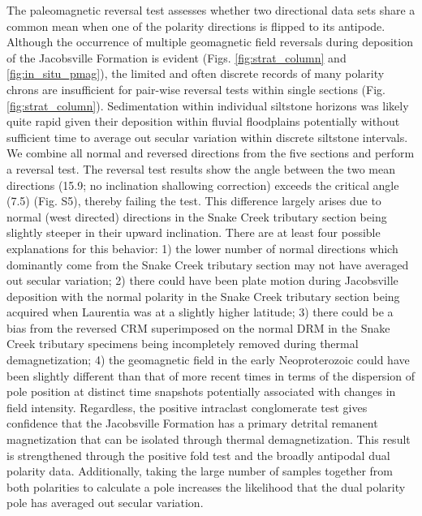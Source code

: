 \documentclass[draft]{agujournal2019}
\begin{document}
The paleomagnetic reversal test assesses whether two directional data sets share a common mean when one of the polarity directions is flipped to its antipode. Although the occurrence of multiple geomagnetic field reversals during deposition of the Jacobsville Formation is evident (Figs. \ref{fig:strat_column} and \ref{fig:in_situ_pmag}), the limited and often discrete records of many polarity chrons are insufficient for pair-wise reversal tests within single sections (Fig. \ref{fig:strat_column}). Sedimentation within individual siltstone horizons was likely quite rapid given their deposition within fluvial floodplains potentially without sufficient time to average out secular variation within discrete siltstone intervals. We combine all normal and reversed directions from the five sections and perform a reversal test. The  reversal test results show the angle between the two mean directions (15.9\textdegree; no inclination shallowing correction) exceeds the critical angle (7.5\textdegree) (Fig. S5), thereby failing the test. This difference largely arises due to normal (west directed) directions in the Snake Creek tributary section being slightly steeper in their upward inclination. There are at least four possible explanations for this behavior: 1) the lower number of normal directions which dominantly come from the Snake Creek tributary section may not have averaged out secular variation; 2) there could have been plate motion during Jacobsville deposition with the normal polarity in the Snake Creek tributary section being acquired when Laurentia was at a slightly higher latitude; 3) there could be a bias from the reversed CRM superimposed on the normal DRM in the Snake Creek tributary specimens being incompletely removed during thermal demagnetization; 4) the geomagnetic field in the early Neoproterozoic could have been slightly different than that of more recent times in terms of the dispersion of pole position at distinct time snapshots potentially associated with changes in field intensity. Regardless, the positive intraclast conglomerate test gives confidence that the Jacobsville Formation has a primary detrital remanent magnetization that can be isolated through thermal demagnetization. This result is strengthened through the positive fold test and the broadly antipodal dual polarity data. Additionally, taking the large number of samples together from both polarities to calculate a pole increases the likelihood that the dual polarity pole has averaged out secular variation.
\end{document}
